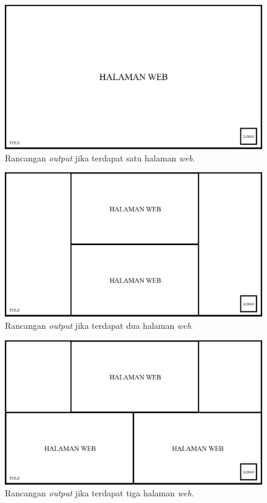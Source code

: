 \begin{figure}[H]
	\centering
		\includegraphics[scale=0.3]{Gambar/output_1.png}
	\caption{Rancangan \textit{output} jika terdapat satu halaman \textit{web}.}
	\label{fig:output1}
\end{figure}

\begin{figure}[H]
	\centering
		\includegraphics[scale=0.3]{Gambar/output_2.png}
	\caption{Rancangan \textit{output} jika terdapat dua halaman \textit{web}.}
	\label{fig:output2}
\end{figure}

\begin{figure}[H]
	\centering
		\includegraphics[scale=0.3]{Gambar/output_3.png}
	\caption{Rancangan \textit{output} jika terdapat tiga halaman \textit{web}.}
	\label{fig:output3}
\end{figure}

